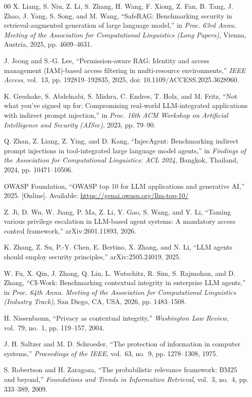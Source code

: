 \documentclass[conference]{IEEEtran}
\begin{document}
\begin{thebibliography}{00}
X. Liang, S. Niu, Z. Li, S. Zhang, H. Wang, F. Xiong, Z. Fan, B. Tang, J. Zhao, J. Yang, S. Song, and M. Wang, ``SafeRAG: Benchmarking security in retrieval-augmented generation of large language model,'' in \emph{Proc. 63rd Annu. Meeting of the Association for Computational Linguistics (Long Papers)}, Vienna, Austria, 2025, pp. 4609--4631.

J. Jeong and S.-G. Lee, ``Permission-aware RAG: Identity and access management (IAM)-based access filtering in multi-resource environments,'' \emph{IEEE Access}, vol.~13, pp. 192819--192835, 2025, doi: 10.1109/ACCESS.2025.3628960.

K. Greshake, S. Abdelnabi, S. Mishra, C. Endres, T. Holz, and M. Fritz, ``Not what you've signed up for: Compromising real-world LLM-integrated applications with indirect prompt injection,'' in \emph{Proc. 16th ACM Workshop on Artificial Intelligence and Security (AISec)}, 2023, pp. 79--90.

Q. Zhan, Z. Liang, Z. Ying, and D. Kang, ``InjecAgent: Benchmarking indirect prompt injections in tool-integrated large language model agents,'' in \emph{Findings of the Association for Computational Linguistics: ACL 2024}, Bangkok, Thailand, 2024, pp. 10471--10506.

OWASP Foundation, ``OWASP top 10 for LLM applications and generative AI,'' 2025. [Online]. Available: \url{https://genai.owasp.org/llm-top-10/}

Z. Ji, D. Wu, W. Jiang, P. Ma, Z. Li, Y. Gao, S. Wang, and Y. Li, ``Taming various privilege escalation in LLM-based agent systems: A mandatory access control framework,'' arXiv:2601.11893, 2026.

K. Zhang, Z. Su, P.-Y. Chen, E. Bertino, X. Zhang, and N. Li, ``LLM agents should employ security principles,'' arXiv:2505.24019, 2025.

W. Fu, X. Qin, J. Zhang, Q. Lin, L. Wutschitz, R. Sim, S. Rajmohan, and D. Zhang, ``CI-Work: Benchmarking contextual integrity in enterprise LLM agents,'' in \emph{Proc. 64th Annu. Meeting of the Association for Computational Linguistics (Industry Track)}, San Diego, CA, USA, 2026, pp. 1483--1508.

H. Nissenbaum, ``Privacy as contextual integrity,'' \emph{Washington Law Review}, vol.~79, no.~1, pp. 119--157, 2004.

J. H. Saltzer and M. D. Schroeder, ``The protection of information in computer systems,'' \emph{Proceedings of the IEEE}, vol.~63, no.~9, pp. 1278--1308, 1975.

S. Robertson and H. Zaragoza, ``The probabilistic relevance framework: BM25 and beyond,'' \emph{Foundations and Trends in Information Retrieval}, vol.~3, no.~4, pp. 333--389, 2009.

\end{thebibliography}
\end{document}
